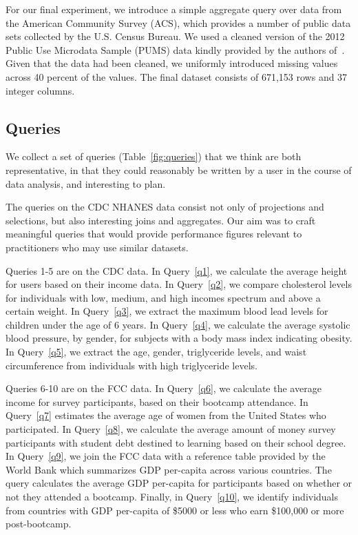 For our final experiment, we introduce a simple aggregate query over data from the American Community Survey (ACS), which
provides a number of public data sets collected by the U.S. Census Bureau.
We used a cleaned version of the 2012 Public Use Microdata Sample (PUMS) data kindly provided by the authors of~\cite{akande2015empirical}.
Given that the data had been cleaned, we uniformly introduced missing values across 40 percent of the values. The final dataset consists
of 671,153 rows and 37 integer columns.

\subsection{Queries}
We collect a set of queries (Table~\ref{fig:queries}) that we think are both representative,
in that they could reasonably be written by a user in the course of data analysis, and
interesting to plan.

The queries on the CDC NHANES data consist not only of projections and selections,
but also interesting joins and aggregates. Our aim was to craft meaningful queries
that would provide performance figures relevant to practitioners who may use
similar datasets.

Queries 1-5 are on the CDC data. In Query~\ref{q1}, we calculate the average height for
users based on their income data. In Query~\ref{q2}, we compare cholesterol levels for
individuals with low, medium, and high incomes spectrum and above a certain weight. In
Query~\ref{q3}, we extract the maximum blood lead levels for children under the age of 6
years. In Query~\ref{q4}, we calculate the average systolic blood pressure, by gender, for
subjects with a body mass index indicating obesity. In Query~\ref{q5}, we extract the age,
gender, triglyceride levels, and waist circumference from individuals with high triglyceride
levels.

Queries 6-10 are on the FCC data. In Query~\ref{q6}, we calculate the average income for
survey participants, based on their bootcamp attendance. In Query~\ref{q7} estimates the
average age of women from the United States who participated. In Query~\ref{q8}, we
calculate the average amount of money survey participants with student debt destined to
learning based on their school degree. In Query~\ref{q9}, we join the FCC data with a
reference table provided by the World Bank which summarizes GDP per-capita across various
countries\cite{worldbank-data}. The query calculates the average GDP per-capita for
participants based on whether or not they attended a bootcamp. Finally, in Query~\ref{q10},
we identify individuals from countries with GDP per-capita of \$5000 or less who earn
\$100,000 or more post-bootcamp.

